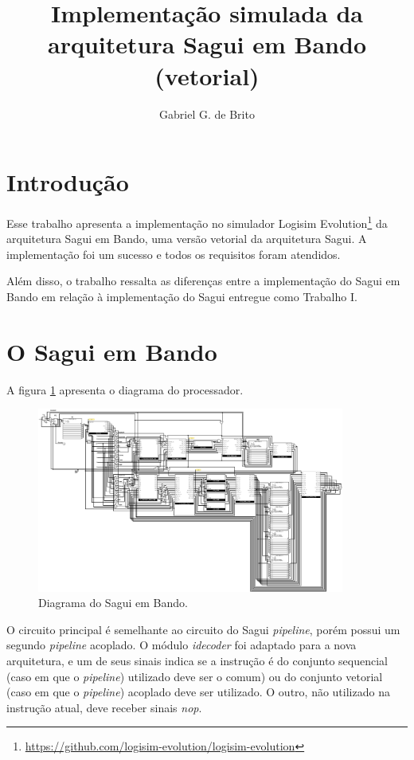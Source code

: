 \documentclass{article}
\author{Gabriel G. de Brito}
\title{Implementação simulada da arquitetura Sagui em Bando (vetorial)}
\begin{document}
\maketitle

\section{Introdução}

Esse trabalho apresenta a implementação no simulador Logisim
Evolution\footnote{\url{https://github.com/logisim-evolution/logisim-evolution}}
da arquitetura Sagui em Bando, uma versão vetorial da arquitetura Sagui. A
implementação foi um sucesso e todos os requisitos foram atendidos.

Além disso, o trabalho ressalta as diferenças entre a implementação do Sagui em
Bando em relação à implementação do Sagui entregue como Trabalho I.

\section{O Sagui em Bando}

A figura \ref{sagui} apresenta o diagrama do processador.

\begin{figure}[h]
	\centering
	\includegraphics[width=0.9\textwidth]{main.png}
	\caption{Diagrama do Sagui em Bando.}
	\label{sagui}
\end{figure}

O circuito principal é semelhante ao circuito do Sagui \textit{pipeline}, porém
possui um segundo \textit{pipeline} acoplado. O módulo \textit{idecoder} foi
adaptado para a nova arquitetura, e um de seus sinais indica se a instrução é
do conjunto sequencial (caso em que o \textit{pipeline}) utilizado deve ser o
comum) ou do conjunto vetorial (caso em que o \textit{pipeline}) acoplado deve
ser utilizado. O outro, não utilizado na instrução atual, deve receber sinais
\textit{nop}.
\end{document}
